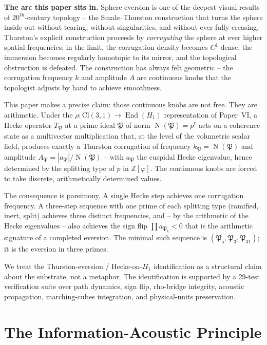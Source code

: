 \documentclass[11pt,a4paper]{article}
\theoremstyle{plain}
\theoremstyle{definition}
\theoremstyle{remark}
\numberwithin{equation}{section}
\providecommand{\Cl}{\mathrm{Cl}}
\providecommand{\Z}{\mathbb{Z}}
\providecommand{\vp}{\varphi}
\providecommand{\fP}{\mathfrak{P}}
\DeclareMathOperator{\End}{End}
\DeclareMathOperator{\Nm}{N}
\begin{document}
\medskip
\noindent\textbf{The arc this paper sits in.}
Sphere eversion is one of the deepest visual results of
$20^{\text{th}}$-century topology -- the Smale--Thurston
construction that turns the sphere inside out without tearing,
without singularities, and without ever fully creasing.  Thurston's
explicit construction proceeds by \emph{corrugating} the sphere at
ever higher spatial frequencies; in the limit, the corrugation
density becomes $C^{1}$-dense, the immersion becomes regularly
homotopic to its mirror, and the topological obstruction is
defeated.  The construction has always felt geometric -- the
corrugation frequency $k$ and amplitude $A$ are continuous knobs
that the topologist adjusts by hand to achieve smoothness.

This paper makes a precise claim: those continuous knobs are not
free.  They are arithmetic.  Under the $\rho:\Cl(3,1)\to\End(H_{1})$
representation of Paper~VI, a Hecke operator $T_\fP$ at a prime
ideal $\fP$ of norm $\Nm(\fP) = p^{r}$ acts on a coherence state
as a multivector multiplication that, at the level of the
volumetric scalar field, produces exactly a Thurston corrugation
of frequency $k_\fP = \Nm(\fP)$ and amplitude
$A_\fP = |a_\fP|/\Nm(\fP)$ -- with $a_\fP$ the cuspidal Hecke
eigenvalue, hence determined by the splitting type of $p$ in
$\Z[\vp]$.  The continuous knobs are forced to take discrete,
arithmetically determined values.

The consequence is parsimony.  A single Hecke step achieves one
corrugation frequency.  A three-step sequence with one prime of
each splitting type (ramified, inert, split) achieves three
distinct frequencies, and -- by the arithmetic of the Hecke
eigenvalues -- also achieves the sign flip
$\prod a_{\fP_k} < 0$ that is the arithmetic signature of a
completed eversion.  The minimal such sequence is
$(\fP_5, \fP_3, \fP_{31})$; it is the eversion in three primes.

We treat the Thurston-eversion / Hecke-on-$H_{1}$ identification
as a structural claim about the substrate, not a metaphor.  The
identification is supported by a 29-test verification suite over
path dynamics, sign flip, rho-bridge integrity, acoustic
propagation, marching-cubes integration, and physical-units
preservation.

\section{The Information-Acoustic Principle}\label{sec:principle}
\end{document}
